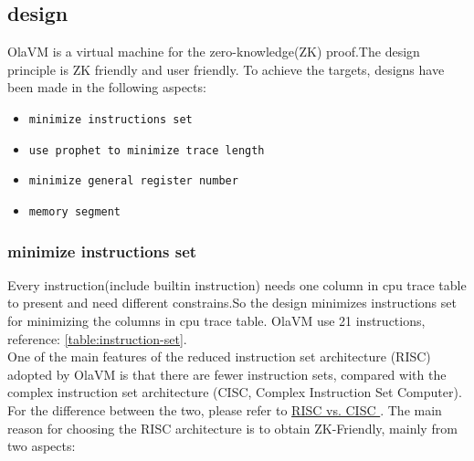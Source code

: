 \subsection{design}\label{subsec: vm-design}
OlaVM is a virtual machine for the zero-knowledge(ZK) proof.The design principle is ZK friendly and user friendly.
To achieve the targets, designs have been made in the following aspects:

\begin{itemize}
    \item \verb|minimize instructions set|
    \item \verb|use prophet to minimize trace length|
    \item \verb|minimize general register number|
    \item \verb|memory segment|
\end{itemize}

\subsubsection{minimize instructions set}
Every instruction(include builtin instruction) needs one column in cpu trace table to present and need different constrains.So the design minimizes instructions set for minimizing the columns in cpu trace table.
OlaVM use 21 instructions, reference: \ref{table:instruction-set}. \\
One of the main features of the reduced instruction set architecture (RISC) adopted by OlaVM is that there are fewer instruction sets, compared with the complex instruction set architecture (CISC, Complex Instruction Set Computer).
For the difference between the two, please refer to \href{https://cs.stanford.edu/people/eroberts/courses/soco/projects/risc/risccisc/}{RISC vs. CISC }.
The main reason for choosing the RISC architecture is to obtain ZK-Friendly, mainly from two aspects:

